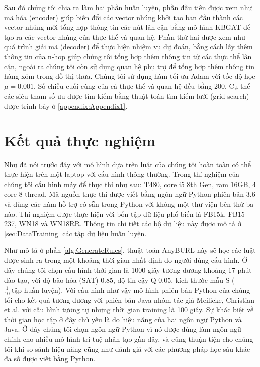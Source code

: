 Sau đó chúng tôi chia ra làm hai phần huấn luyện, phần đầu tiên được xem như mã hóa (encoder) giúp biến đổi các vector nhúng khởi tạo ban đầu thành các vector nhúng mới tổng hợp thông tin các nút lân cận bằng mô hình KBGAT để tạo ra các vector nhúng của thực thể và quan hệ. Phần thứ hai được xem như quá trình giải mã (decoder) để thực hiện nhiệm vụ dự đoán, bằng cách lấy thêm thông tin của n-hop giúp chúng tôi tổng hợp thêm thông tin từ các thực thể lân cận, ngoài ra chúng tôi còn sử dụng quan hệ phụ trợ để tổng hợp thêm thông tin hàng xóm trong đồ thị thưa. Chúng tôi sử dụng hàm tối ưu Adam với tốc độ học $\mu = 0.001$. Số chiều cuối cùng của cả thực thể và quan hệ đều bằng 200. Cụ thể các siêu tham số ưu được tìm kiếm bằng thuật toán tìm kiếm lưới (grid search) được trình bày ở \autoref{appendix:Appendix1}.

\section{Kết quả thực nghiệm}
\label{sec:Experiment}

Như đã nói trước đây với mô hình dựa trên luật của chúng tôi hoàn toàn có thể thực hiện trên một laptop với cấu hình thông thường. Trong thí nghiệm của chúng tôi cấu hình máy để thực thi như sau: T480, core i5 8th Gen, ram 16GB, 4 core 8 thread. Mã nguồn thực thi được viết bằng ngôn ngữ Python phiên bản 3.6 và dùng các hàm hỗ trợ có sẵn trong Python với không một thư viện bên thứ ba nào. Thí nghiệm được thực hiện với bốn tập dữ liệu phổ biến là FB15k, FB15-237, WN18 và WN18RR. Thông tin chi tiết các bộ dữ liệu này được mô tả ở \autoref{sec:DataTraining} các tập dữ liệu huấn luyện.





Như mô tả ở phần \autoref{alg:GenerateRules}, thuật toán AnyBURL này sẽ học các luật được sinh ra trong một khoảng thời gian nhất định do người dùng cấu hình. Ở đây chúng tôi chọn cấu hình thời gian là 1000 giây tương đương khoảng 17 phút đào tạo, với độ bão hòa (SAT) \(0.85\), độ tin cậy Q \(0.05\), kích thước mẫu S (\(\frac{1}{10}~ \text{tập huấn luyện}\)). Với cấu hình như vậy mô hình phiên bản Python của chúng tối cho kết quả tương đương với phiên bản Java nhóm tác giả Meilicke, Christian et al. \cite{burl} với cấu hình tương tự nhưng thời gian training là 100 giây. Sự khác biệt về thời gian học tập ở đây chủ yếu là do hiệu năng của hai ngôn ngữ Python và Java. Ở đây chúng tôi chọn ngôn ngữ Python vì nó được dùng làm ngôn ngữ chính cho nhiều mô hình trí tuệ nhân tạo gần đây, và cũng thuận tiện cho chúng tôi khi so sánh hiệu năng cũng như đánh giá với các phương pháp học sâu khác đa số được viết bằng Python.


